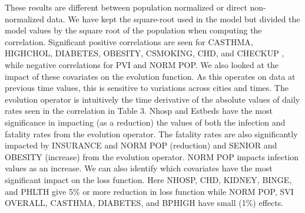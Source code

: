 \documentclass[letterpaper, inpress]{jds} %
\renewcommand{\_}{%
    \textunderscore\hspace{0pt}%
}
\begin{document}
These results are different between population normalized or direct
non-normalized data. We have kept the square-root used in the model
but divided the model values by the square root of the population when
computing the correlation. Significant positive correlations are seen
for CASTHMA, HIGHCHOL, DIABETES, OBESITY, CSMOKING, CHD, and CHECKUP ,
while negative correlations for PVI and NORM\_POP. We also looked at
the impact of these covariates on the evolution function. As this
operates on data at previous time values, this is sensitive to
variations across cities and times. The evolution operator is
intuitively the time derivative of the absolute values of daily rates
seen in the correlation in Table 3. Nhosp and Estbeds have the most
significance in impacting (as a reduction) the values of both the
infection and fatality rates from the evolution operator. The fatality
rates are also significantly impacted by INSURANCE and NORM\_POP
(reduction) and SENIOR and OBESITY (increase) from the evolution
operator. NORM\_POP impacts infection values as an increase.  We can
also identify which covariates have the most significant impact on the
loss function. Here NHOSP, CHD, KIDNEY, BINGE, and PHLTH give 5\% or
more reduction in loss function while NORM\_POP, SVI\_OVERALL,
CASTHMA, DIABETES, and BPHIGH have small (1\%) effects.
\end{document}
